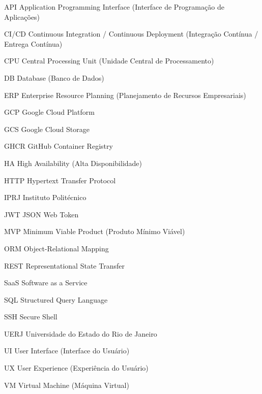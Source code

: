 \begin{siglas}
\item[API] Application Programming Interface (Interface de Programação de Aplicações)
\item[CI/CD] Continuous Integration / Continuous Deployment (Integração Contínua / Entrega Contínua)
\item[CPU] Central Processing Unit (Unidade Central de Processamento)
\item[DB] Database (Banco de Dados)
\item[ERP] Enterprise Resource Planning (Planejamento de Recursos Empresariais)
\item[GCP] Google Cloud Platform
\item[GCS] Google Cloud Storage
\item[GHCR] GitHub Container Registry
\item[HA] High Availability (Alta Disponibilidade)
\item[HTTP] Hypertext Transfer Protocol
\item[IPRJ] Instituto Politécnico
\item[JWT] JSON Web Token
\item[MVP] Minimum Viable Product (Produto Mínimo Viável)
\item[ORM] Object-Relational Mapping
\item[REST] Representational State Transfer
\item[SaaS] Software as a Service
\item[SQL] Structured Query Language
\item[SSH] Secure Shell
\item[UERJ] Universidade do Estado do Rio de Janeiro
\item[UI] User Interface (Interface do Usuário)
\item[UX] User Experience (Experiência do Usuário)
\item[VM] Virtual Machine (Máquina Virtual)
\end{siglas}
